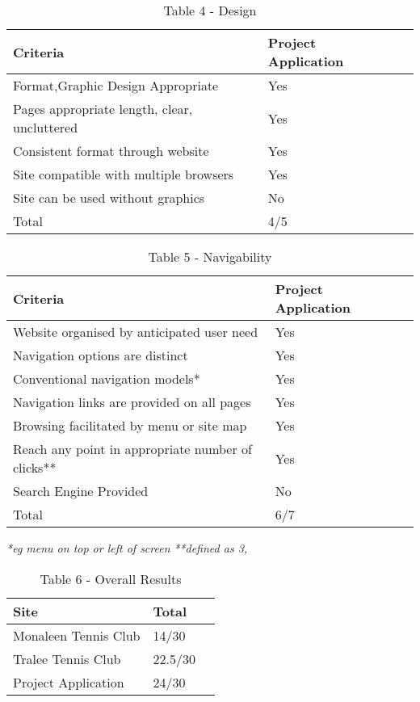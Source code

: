 \begin{table}[H]
\caption{Table 4 - Design}
\begin{center}
    \begin{tabular}{ | l | l | p{5cm} |}
    \hline
\textbf{Criteria} & \textbf{Project Application}\\ \hline
	Format,Graphic Design Appropriate & Yes \\ \hline
	Pages appropriate length, clear, uncluttered& Yes \\ \hline
	Consistent format through website & Yes \\ \hline
	Site compatible with multiple browsers & Yes\\ \hline
	Site can be used without graphics & No\\ \hline
	Total & 4/5 \\ \hline	
    \end{tabular}
\end{center}
\label{fig:projecttable4}
\end{table}

\begin{table}[H]
\caption{Table 5 - Navigability}
\begin{center}
    \begin{tabular}{ | l | l | p{5cm} |}
    \hline
	\textbf{Criteria} & \textbf{Project Application}\\ \hline
	Website organised by anticipated user need & Yes\\ \hline
	Navigation options are distinct& Yes \\ \hline
	Conventional navigation models*& Yes\\ \hline
	Navigation links are provided on all pages & Yes\\ \hline
	Browsing facilitated by menu or site map &Yes \\ \hline
	Reach any point in appropriate number of clicks** & Yes\\ \hline
	Search Engine Provided & No\\ \hline
	Total & 6/7 \\ \hline	
    \end{tabular}
\end{center}
\label{fig:projecttable5}
\end{table}
\textit{*eg menu on top or left of screen}\newline
\textit{**defined as 3,} \cite{smith2001applying}

\begin{table}[H]
\caption{Table 6 - Overall Results}
\begin{center}
    \begin{tabular}{ | l | l | p{5cm} |}
    \hline
	Site & Total\\ \hline
	Monaleen Tennis Club & 14/30\\ \hline
	Tralee Tennis Club & 22.5/30\\ \hline
	Project Application & 24/30\\ \hline	
    \end{tabular}
\end{center}
\label{fig:projecttable6}
\end{table}

